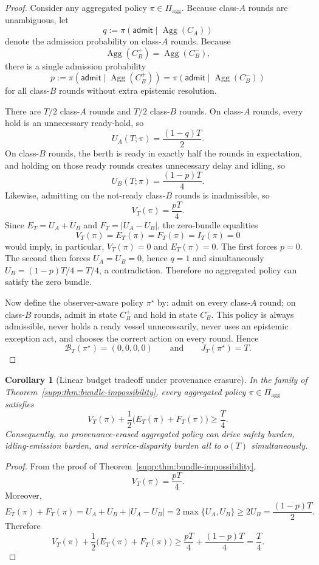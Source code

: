 \documentclass[11pt]{article}
\newcommand{\Agg}{\operatorname{Agg}}
\newcommand{\1}{\mathbf{1}}
\theoremstyle{definition}
\theoremstyle{plain}
\newtheorem{corollary}[definition]{Corollary}
\theoremstyle{remark}
\begin{document}
\begin{proof}
Consider any aggregated policy $\pi\in\Pi_{\mathrm{agg}}$. Because class-$A$ rounds are unambiguous, let
\[
q:=\pi(\mathsf{admit}\mid \Agg(C_A))
\]
denote the admission probability on class-$A$ rounds. Because
\[
\Agg(C_B^+)=\Agg(C_B^-),
\]
there is a single admission probability
\[
p:=\pi(\mathsf{admit}\mid \Agg(C_B^+))=\pi(\mathsf{admit}\mid \Agg(C_B^-))
\]
for all class-$B$ rounds without extra epistemic resolution.

There are $T/2$ class-$A$ rounds and $T/2$ class-$B$ rounds. On class-$A$ rounds, every hold is an unnecessary ready-hold, so
\[
U_A(T;\pi)=\frac{(1-q)T}{2}.
\]
On class-$B$ rounds, the berth is ready in exactly half the rounds in expectation, and holding on those ready rounds creates unnecessary delay and idling, so
\[
U_B(T;\pi)=\frac{(1-p)T}{4}.
\]
Likewise, admitting on the not-ready class-$B$ rounds is inadmissible, so
\[
V_T(\pi)=\frac{pT}{4}.
\]
Since $E_T=U_A+U_B$ and $F_T=|U_A-U_B|$, the zero-bundle equalities
\[
V_T(\pi)=E_T(\pi)=F_T(\pi)=I_T(\pi)=0
\]
would imply, in particular, $V_T(\pi)=0$ and $E_T(\pi)=0$. The first forces $p=0$. The second then forces $U_A=U_B=0$, hence $q=1$ and simultaneously $U_B=(1-p)T/4=T/4$, a contradiction. Therefore no aggregated policy can satisfy the zero bundle.

Now define the observer-aware policy $\pi^{\star}$ by: admit on every class-$A$ round; on class-$B$ rounds, admit in state $C_B^+$ and hold in state $C_B^-$. This policy is always admissible, never holds a ready vessel unnecessarily, never uses an epistemic exception act, and chooses the correct action on every round. Hence
\[
\mathcal B_T(\pi^{\star})=(0,0,0,0)
\qquad\text{and}\qquad
J_T(\pi^{\star})=T.
\]
\end{proof}

\begin{corollary}[Linear budget tradeoff under provenance erasure]
\label{supp:cor:bundle-tradeoff}
In the family of Theorem~\ref{supp:thm:bundle-impossibility}, every aggregated policy $\pi\in\Pi_{\mathrm{agg}}$ satisfies
\[
V_T(\pi)+\frac{1}{2}\big(E_T(\pi)+F_T(\pi)\big)\ge \frac{T}{4}.
\]
Consequently, no provenance-erased aggregated policy can drive safety burden, idling-emission burden, and service-disparity burden all to $o(T)$ simultaneously.
\end{corollary}

\begin{proof}
From the proof of Theorem~\ref{supp:thm:bundle-impossibility},
\[
V_T(\pi)=\frac{pT}{4}.
\]
Moreover,
\[
E_T(\pi)+F_T(\pi)
=
U_A+U_B+|U_A-U_B|
=2\max\{U_A,U_B\}
\ge 2U_B
=\frac{(1-p)T}{2}.
\]
Therefore
\[
V_T(\pi)+\frac{1}{2}\big(E_T(\pi)+F_T(\pi)\big)
\ge
\frac{pT}{4}+\frac{(1-p)T}{4}
=\frac{T}{4}.
\]
\end{proof}
\end{document}
